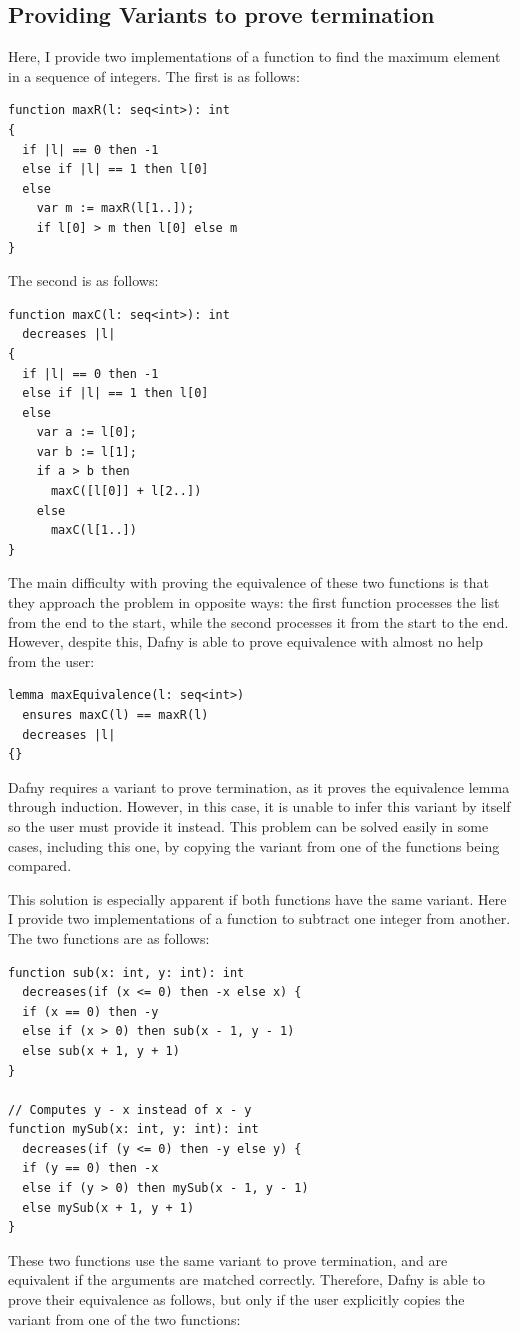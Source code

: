 \documentclass[a4paper, 11pt]{article}
\begin{document}
\subsection{Providing Variants to prove termination}

Here, I provide two implementations of a function to find the maximum element in a sequence of integers. The first is as follows:
\begin{lstlisting}[caption=\lstinline|maxR| Function]
function maxR(l: seq<int>): int
{
  if |l| == 0 then -1
  else if |l| == 1 then l[0]
  else
    var m := maxR(l[1..]);
    if l[0] > m then l[0] else m
}
\end{lstlisting}
%
The second is as follows:
\begin{lstlisting}[caption=\lstinline|maxC| Function]
function maxC(l: seq<int>): int
  decreases |l|
{
  if |l| == 0 then -1
  else if |l| == 1 then l[0]
  else
    var a := l[0];
    var b := l[1];
    if a > b then
      maxC([l[0]] + l[2..])
    else
      maxC(l[1..])
}
\end{lstlisting}
%
The main difficulty with proving the equivalence of these two functions is that they approach the problem in opposite ways: the first function processes the list from the end to the start, while the second processes it from the start to the end. However, despite this, Dafny is able to prove equivalence with almost no help from the user:
\begin{lstlisting}[caption=Equivalence Lemma for \lstinline|maxC| and \lstinline|maxR|]
lemma maxEquivalence(l: seq<int>)
  ensures maxC(l) == maxR(l)
  decreases |l|
{}
\end{lstlisting}
%
Dafny requires a variant to prove termination, as it proves the equivalence lemma through induction. However, in this case, it is unable to infer this variant by itself so the user must provide it instead. This problem can be solved easily in some cases, including this one, by copying the variant from one of the functions being compared.

This solution is especially apparent if both functions have the same variant. Here I provide two implementations of a function to subtract one integer from another. The two functions are as follows:
\begin{lstlisting}[caption=\lstinline|sub| and \lstinline|mySub| Functions]
function sub(x: int, y: int): int
  decreases(if (x <= 0) then -x else x) {
  if (x == 0) then -y
  else if (x > 0) then sub(x - 1, y - 1)
  else sub(x + 1, y + 1)
}

// Computes y - x instead of x - y
function mySub(x: int, y: int): int
  decreases(if (y <= 0) then -y else y) {
  if (y == 0) then -x
  else if (y > 0) then mySub(x - 1, y - 1)
  else mySub(x + 1, y + 1)
}
\end{lstlisting}
%
These two functions use the same variant to prove termination, and are equivalent if the arguments are matched correctly. Therefore, Dafny is able to prove their equivalence as follows, but only if the user explicitly copies the variant from one of the two functions:
\end{document}
